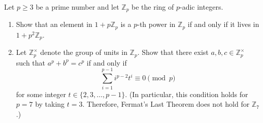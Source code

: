 \begin{exercise}
\label{algebra:2020:5}
Let $p \geq 3$ be a prime number and let $\mathbb{Z}_p$ be the ring of $p$-adic integers.

\begin{enumerate}
\item Show that an element in $1 + p\mathbb{Z}_p$ is a $p$-th power in $\mathbb{Z}_p$ if and only if it lives in $1 + p^2\mathbb{Z}_p$.

\item Let $\mathbb{Z}_p^\times$ denote the group of units in $\mathbb{Z}_p$. Show that there exist $a, b, c \in \mathbb{Z}_p^\times$ such that $a^p + b^p = c^p$ if and only if
\[\sum_{i=1}^{p-1} i^{p-2} t^i \equiv 0 \pmod{p}\]
for some integer $t \in \{2, 3, \ldots, p-1\}$. (In particular, this condition holds for $p = 7$ by taking $t = 3$. Therefore, Fermat's Last Theorem does not hold for $\mathbb{Z}_7$.)
\end{enumerate}
\end{exercise}

